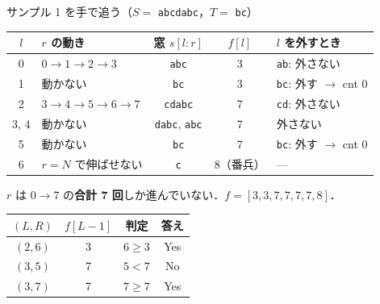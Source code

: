 \documentclass[dvipdfmx,aspectratio=169]{beamer}
\begin{document}
\begin{frame}{サンプル 1 を手で追う（$S=$ \texttt{abcdabc}，$T=$ \texttt{bc}）}
  \centering
  {\small
  \begin{tabular}{clccl}
    \toprule
    $l$ & $r$ の動き & 窓 $s[l:r]$ & $f[l]$ & $l$ を外すとき\\
    \midrule
    0 & $0\to1\to2\to3$ & \texttt{abc} & 3 & \texttt{ab}: 外さない\\
    1 & 動かない & \texttt{bc} & 3 & \texttt{bc}: \textcolor{ng}{外す $\to$ cnt 0}\\
    2 & $3\to4\to5\to6\to7$ & \texttt{cdabc} & 7 & \texttt{cd}: 外さない\\
    3, 4 & 動かない & \texttt{dabc}, \texttt{abc} & 7 & 外さない\\
    5 & 動かない & \texttt{bc} & 7 & \texttt{bc}: \textcolor{ng}{外す $\to$ cnt 0}\\
    6 & $r=N$ で伸ばせない & \texttt{c} & 8（番兵） & ---\\
    \bottomrule
  \end{tabular}}

  \vspace{0.5em}
  \raggedright
  $r$ は $0 \to 7$ の\textbf{合計 7 回}しか進んでいない．$f = [3,3,7,7,7,7,8]$．

  \vspace{0.3em}
  \centering
  {\small
  \begin{tabular}{cccc}
    \toprule
    $(L,R)$ & $f[L-1]$ & 判定 & 答え\\
    \midrule
    $(2,6)$ & 3 & $6 \ge 3$ & \textcolor{ok}{Yes}\\
    $(3,5)$ & 7 & $5 < 7$ & \textcolor{ng}{No}\\
    $(3,7)$ & 7 & $7 \ge 7$ & \textcolor{ok}{Yes}\\
    \bottomrule
  \end{tabular}}
\end{frame}
\end{document}
